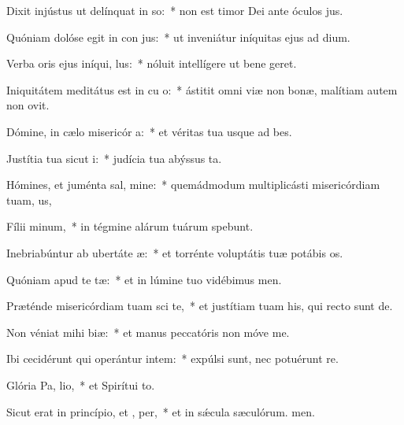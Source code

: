 \item Dixit injústus ut delínquat in so:~* non est timor Dei ante óculos jus.
\item Quóniam dolóse egit in con jus:~* ut inveniátur iníquitas ejus ad dium.
\item Verba oris ejus iníqui,  lus:~* nóluit intellígere ut bene geret.
\item Iniquitátem meditátus est in cu o:~* ástitit omni viæ non bonæ, malítiam autem non ovit.
\item Dómine, in cælo misericór a:~* et véritas tua usque ad bes.
\item Justítia tua sicut  i:~* judícia tua abýssus ta.
\item Hómines, et juménta sal, mine:~* quemádmodum multiplicásti misericórdiam tuam, us,
\item Fílii  minum,~* in tégmine alárum tuárum spebunt.
\item Inebriabúntur ab ubertáte  æ:~* et torrénte voluptátis tuæ potábis os.
\item Quóniam apud te   tæ:~* et in lúmine tuo vidébimus men.
\item Præténde misericórdiam tuam sci te,~* et justítiam tuam his, qui recto sunt de.
\item Non véniat mihi  biæ:~* et manus peccatóris non móve me.
\item Ibi cecidérunt qui operántur intem:~* expúlsi sunt, nec potuérunt re.
\item Glória Pa,  lio,~* et Spirítui to.
\item Sicut erat in princípio, et ,  per,~* et in sǽcula sæculórum. men.
